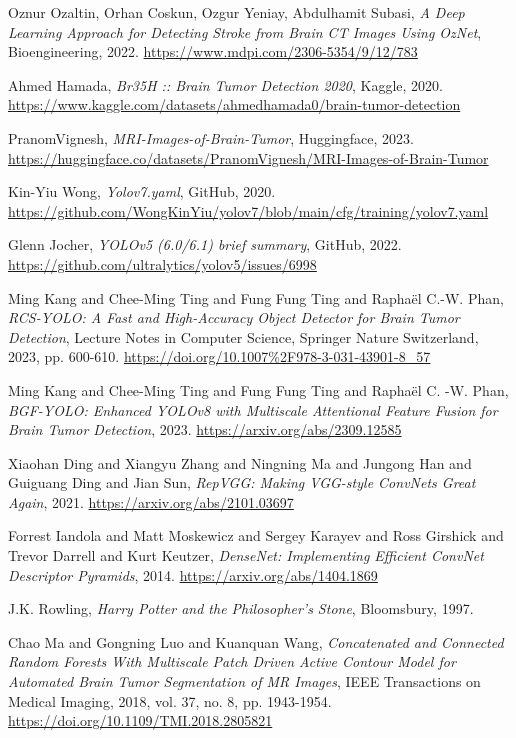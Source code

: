 \documentclass[conference]{IEEEtran}
\begin{document}
\begin{thebibliography}{00}

Oznur Ozaltin, Orhan Coskun, Ozgur Yeniay, Abdulhamit Subasi,
\emph{A Deep Learning Approach for Detecting Stroke from Brain CT Images Using OzNet},
Bioengineering,
2022.
\url{https://www.mdpi.com/2306-5354/9/12/783}

Ahmed Hamada,
\emph{Br35H :: Brain Tumor Detection 2020},
Kaggle,
2020.
\url{https://www.kaggle.com/datasets/ahmedhamada0/brain-tumor-detection}

PranomVignesh,
\emph{MRI-Images-of-Brain-Tumor},
Huggingface,
2023.
\url{https://huggingface.co/datasets/PranomVignesh/MRI-Images-of-Brain-Tumor}

Kin-Yiu Wong,
\emph{Yolov7.yaml},
GitHub,
2020.
\url{https://github.com/WongKinYiu/yolov7/blob/main/cfg/training/yolov7.yaml}

Glenn Jocher,
\emph{YOLOv5 (6.0/6.1) brief summary},
GitHub,
2022.
\url{https://github.com/ultralytics/yolov5/issues/6998}

Ming Kang and Chee-Ming Ting and Fung Fung Ting and Raphaël C.-W. Phan,
\emph{RCS-YOLO: A Fast and High-Accuracy Object Detector for Brain Tumor Detection},
Lecture Notes in Computer Science,
Springer Nature Switzerland,
2023,
pp. 600-610.
\url{https://doi.org/10.1007%2F978-3-031-43901-8_57}

Ming Kang and Chee-Ming Ting and Fung Fung Ting and Raphaël C. -W. Phan,
\emph{BGF-YOLO: Enhanced YOLOv8 with Multiscale Attentional Feature Fusion for Brain Tumor Detection},
2023.
\url{https://arxiv.org/abs/2309.12585}

Xiaohan Ding and Xiangyu Zhang and Ningning Ma and Jungong Han and Guiguang Ding and Jian Sun,
\emph{RepVGG: Making VGG-style ConvNets Great Again},
2021.
\url{https://arxiv.org/abs/2101.03697}

Forrest Iandola and Matt Moskewicz and Sergey Karayev and Ross Girshick and Trevor Darrell and Kurt Keutzer,
\emph{DenseNet: Implementing Efficient ConvNet Descriptor Pyramids},
2014.
\url{https://arxiv.org/abs/1404.1869}

J.K. Rowling,
\emph{Harry Potter and the Philosopher's Stone},
Bloomsbury,
1997.

Chao Ma and Gongning Luo and Kuanquan Wang,
\emph{Concatenated and Connected Random Forests With Multiscale Patch Driven Active Contour Model for Automated Brain Tumor Segmentation of MR Images},
IEEE Transactions on Medical Imaging,
2018,
vol. 37, no. 8, pp. 1943-1954.
\url{https://doi.org/10.1109/TMI.2018.2805821}


\end{thebibliography}
\end{document}
